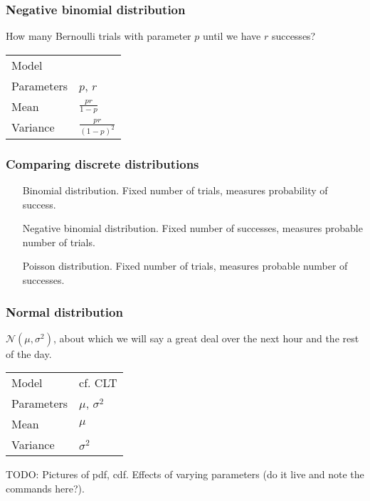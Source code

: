 \documentclass[t]{beamer}
\newcommand\N[0]{\mathcal{N}}
\begin{document}
\begin{frame}
  \frametitle{Negative binomial distribution}

  How many Bernoulli trials with parameter $p$ until we have $r$
  successes?

  \begin{tabular}{ll}
    Model & \\[1mm]
    Parameters & $p$, $r$\\[1mm]
    Mean & $\frac{pr}{1-p}$\\[1mm]
    Variance & $\frac{pr}{(1-p)^2}$
  \end{tabular}

\end{frame}

\begin{frame}
  \frametitle{Comparing discrete distributions}

  \begin{itemize}
  \item[Binomial distribution.]  Fixed number of trials, measures probability of success.
  \item[Negative binomial distribution.] Fixed number of successes, measures
    probable number of trials.
  \item[Poisson distribution.]  Fixed number of trials, measures
    probable number of successes.
  \end{itemize}

\end{frame}

\begin{frame}
  \frametitle{Normal distribution}

  $\N(\mu,\sigma^2)$, about which we will say a great deal over the
  next hour and the rest of the day.
  \bigskip
  
  \begin{tabular}{ll}
    Model & cf. CLT\\[1mm]
    Parameters & $\mu$, $\sigma^2$\\[1mm]
    Mean & $\mu$\\[1mm]
    Variance & $\sigma^2$
  \end{tabular}

  TODO: Pictures of pdf, cdf.  Effects of varying parameters (do it live and note the commands here?).
  
  
\end{frame}
\end{document}
